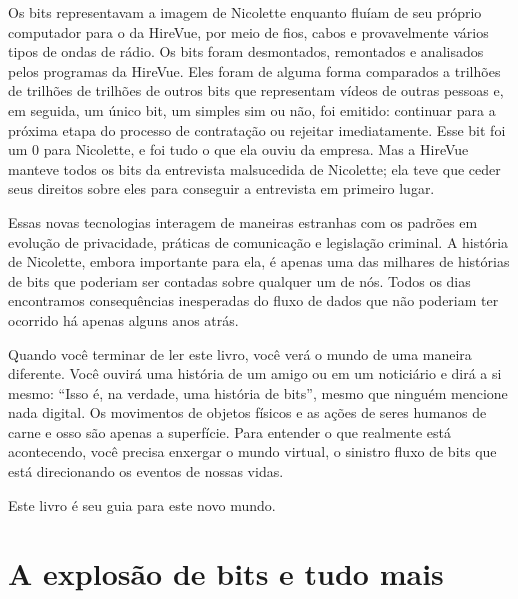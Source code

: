 Os bits representavam a imagem de Nicolette enquanto fluíam de seu próprio
computador para o da HireVue, por meio de fios, cabos e provavelmente vários
tipos de ondas de rádio. Os bits foram desmontados, remontados e analisados
pelos programas da HireVue. Eles foram de alguma forma comparados a trilhões de
trilhões de trilhões de outros bits que representam vídeos de outras pessoas e,
em seguida, um único bit, um simples sim ou não, foi emitido: continuar para a
próxima etapa do processo de contratação ou rejeitar imediatamente. Esse bit foi
um $0$ para Nicolette, e foi tudo o que ela ouviu da empresa. Mas a HireVue
manteve todos os bits da entrevista malsucedida de Nicolette; ela teve que ceder
seus direitos sobre eles para conseguir a entrevista em primeiro lugar.

Essas novas tecnologias interagem de maneiras estranhas com os padrões em
evolução de privacidade, práticas de comunicação e legislação criminal. A
história de Nicolette, embora importante para ela, é apenas uma das milhares de
histórias de bits que poderiam ser contadas sobre qualquer um de nós. Todos os
dias encontramos consequências inesperadas do fluxo de dados que não poderiam
ter ocorrido há apenas alguns anos atrás.

Quando você terminar de ler este livro, você verá o mundo de uma maneira 
diferente. Você ouvirá uma história de um amigo ou em um noticiário e dirá a si 
mesmo: ``Isso é, na verdade, uma história de bits'', mesmo que ninguém mencione
nada digital. Os movimentos de objetos físicos e as ações de seres humanos de 
carne e osso são apenas a superfície. Para entender o que realmente está 
acontecendo, você precisa enxergar o mundo virtual, o sinistro fluxo de bits 
que está direcionando os eventos de nossas vidas.

Este livro é seu guia para este novo mundo.


\section{A explosão de bits e tudo mais}
\label{cap1:exp-dig-bits}

